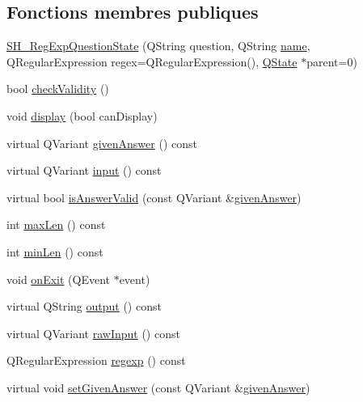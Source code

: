 \subsection*{Fonctions membres publiques}
\begin{DoxyCompactItemize}
\item 
\hyperlink{classSH__RegExpQuestionState_a4b4263f6933e16d2535b7c04b7a8dc3a}{S\-H\-\_\-\-Reg\-Exp\-Question\-State} (Q\-String question, Q\-String \hyperlink{classSH__NamedObject_a970f265df31b28b2179bbbceb6170ac2}{name}, Q\-Regular\-Expression regex=Q\-Regular\-Expression(), \hyperlink{classQState}{Q\-State} $\ast$parent=0)
\item 
bool \hyperlink{classSH__QuestionState_a3ca5459c20ef591023c0572d8224146c}{check\-Validity} ()
\item 
void \hyperlink{classSH__InOutState_a918e8a7f5fe00dc16004e46eeee1281d}{display} (bool can\-Display)
\item 
virtual Q\-Variant \hyperlink{classSH__QuestionState_abde97c61175be95358ece622fd16593e}{given\-Answer} () const 
\item 
virtual Q\-Variant \hyperlink{classSH__InOutState_a04364c76d2fd8a3781e7b325955e5bd9}{input} () const 
\item 
virtual bool \hyperlink{classSH__RegExpQuestionState_a6625c6720ebcad6b6411e5275c36157b}{is\-Answer\-Valid} (const Q\-Variant \&\hyperlink{classSH__QuestionState_abde97c61175be95358ece622fd16593e}{given\-Answer})
\item 
int \hyperlink{classSH__StringQuestionState_a51f49c3563bacbcc92ca7bed0631269e}{max\-Len} () const 
\item 
int \hyperlink{classSH__StringQuestionState_a4f988ca17ec5e74db4ef1f83997606d9}{min\-Len} () const 
\item 
void \hyperlink{classSH__InOutState_a36636cba0d68476288bce5fd4c041db0}{on\-Exit} (Q\-Event $\ast$event)
\item 
virtual Q\-String \hyperlink{classSH__InOutState_a1a2fd4f34484125058e20730aaee7e46}{output} () const 
\item 
virtual Q\-Variant \hyperlink{classSH__InOutState_a4b1ca094de91c47690ec2d1e95678273}{raw\-Input} () const 
\item 
Q\-Regular\-Expression \hyperlink{classSH__RegExpQuestionState_a5fe3fd070e922885a127029ce2e80b6c}{regexp} () const 
\item 
virtual void \hyperlink{classSH__QuestionState_a9d285a34a7002fd05a7fa8ff9139c264}{set\-Given\-Answer} (const Q\-Variant \&\hyperlink{classSH__QuestionState_abde97c61175be95358ece622fd16593e}{given\-Answer})

\end{DoxyCompactItemize}

